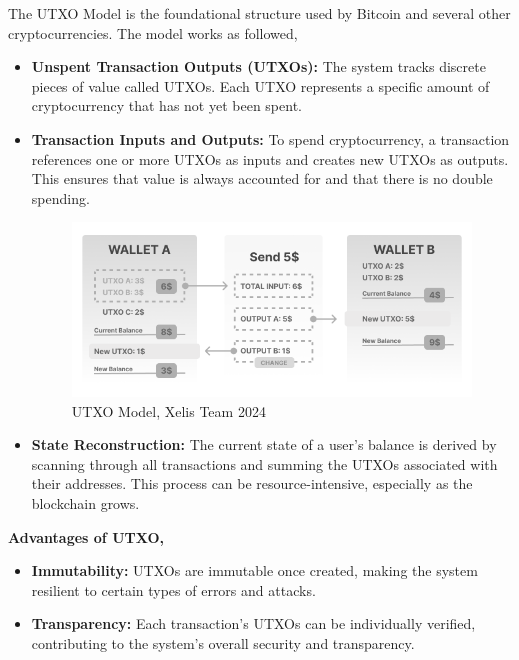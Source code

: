 \documentclass[10pt,a4paper,twocolumn]{article}
\begin{document}
The UTXO Model is the foundational structure used by Bitcoin and several other cryptocurrencies. The model works as followed,\\

\begin{itemize}
    \item \textbf{Unspent Transaction Outputs (UTXOs):} The system tracks discrete pieces of value called UTXOs. Each UTXO represents a specific amount of cryptocurrency that has not yet been spent.\\
    
    \item \textbf{Transaction Inputs and Outputs:} To spend cryptocurrency, a transaction references one or more UTXOs as inputs and creates new UTXOs as outputs. This ensures that value is always accounted for and that there is no double spending.\\
   
\begin{figure}
\centering
\includegraphics[width=1\linewidth]{Frame 1 (8).png}
\caption{UTXO Model, Xelis Team 2024}
\end{figure}
  
\item \textbf{State Reconstruction:} The current state of a user's balance is derived by scanning through all transactions and summing the UTXOs associated with their addresses. This process can be resource-intensive, especially as the blockchain grows.\\
\end{itemize}

\textbf{Advantages of UTXO,}\\
\begin{itemize}
\item \textbf{Immutability:} UTXOs are immutable once created, making the system resilient to certain types of errors and attacks.\\ 

\item \textbf{Transparency:} Each transaction’s UTXOs can be individually verified, contributing to the system's overall security and transparency.\\
\end{itemize}
\end{document}
